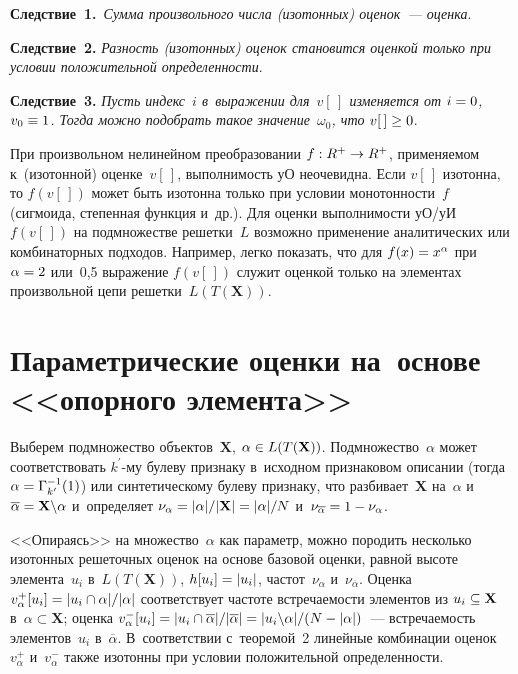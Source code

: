 \begin{multicols}{2}
     \noindent
\textbf{Следствие~1.}\ \textit{Сумма произвольного чис\-ла (изотонных) 
оценок~--- оценка}.

     \smallskip
     
     \noindent
\textbf{Следствие~2.} \textit{Раз\-ность (изотонных) оценок становится 
оцен\-кой только при условии положительной опре\-де\-лен\-ности}.

     \smallskip
     
     \noindent
\textbf{Следствие~3.} \textit{Пусть индекс~$i$ в~выражении 
для~$v[\,]$ изменяется от $i\hm=0$, $v_0\hm\equiv 1$. Тогда мож\-но 
по\-до\-брать такое значение~$\omega_0$, что} $v[\,]\hm\geq 0$. 
    
\smallskip

При произвольном нелинейном преобразовании $f: R^+\hm\to R^+$, 
при\-ме\-ня\-емом к~(изотонной) оцен\-ке~$v[\,]$, вы\-пол\-ни\-мость уО неочевидна. 
Если $v[\,]$ изотонна, то $f(v[\,])$ может быть изотонна только при условии 
мо\-но\-тон\-ности~$f$ (сигмоида, степенная функция и~др.). Для оценки 
вы\-пол\-ни\-мости уО/уИ $f(v[\,])$ на подмножестве решетки~$L$ воз\-мож\-но 
применение аналитических или комбинаторных подходов. Например, лег\-ко 
показать, что для $f(x)\hm= x^\alpha$ при $\alpha\hm=2$ или~0,5 выражение 
$f(v[\,])$ служит оцен\-кой только на элементах произвольной цепи решетки~$L(T(\mathbf{X}))$. 

\section{Параметрические оценки на~основе <<опорного 
элемента>>} 

Выберем подмножество объектов~$\mathbf{X}$, $\alpha \hm\in 
L(T(\mathbf{X}))$. Подмножество~$\alpha$ может соответствовать 
$k^\prime$-му булеву при\-зна\-ку в~исходном при\-зна\-ко\-вом описании (тогда 
$\alpha\hm= \Gamma^{-1}_{k^\prime} (1)$) или синтетическому булеву 
при\-зна\-ку, что разбивает~$\mathbf{X}$ на~$\alpha$ и~$\overline{\alpha}\hm= 
\mathbf{X}\backslash \alpha$ и~определяет $\nu_\alpha \hm= \vert \alpha \vert / 
\vert \mathbf{X}\vert \hm= \vert\alpha\vert / N$ 
и~$\nu_{\overline{\alpha}}\hm=1\hm- \nu_\alpha$. 
     
     <<Опираясь>> на множество~$\alpha$ как параметр, мож\-но породить 
несколько изотонных решеточных оценок на основе базовой оцен\-ки, рав\-ной 
высоте элемента~$u_i$ в~$L(T(\mathbf{X}))$, $h[u_i] \hm= \vert u_i\vert$, 
час\-тот~$\nu_\alpha$ и~$\nu_{\overline{\alpha}}$. Оцен\-ка $v_\alpha^+ [u_i] 
\hm= \vert u_i \cap \alpha \vert / \vert\alpha\vert$ соответствует час\-то\-те 
встре\-ча\-емости элементов из $u_i\hm\subseteq \mathbf{X}$ в~$\alpha \subset 
\mathbf{X}$; оцен\-ка $v_\alpha^-[u_i]\hm= \vert u_i \cap \overline{\alpha}\vert / 
\vert \overline{\alpha}\vert \hm= \vert u_i \backslash\alpha\vert / (N\hm- 
\vert\alpha\vert)$~--- встре\-ча\-емость элементов~$u_i$ в~$\overline{\alpha}$. 
В~соответствии с~тео\-ре\-мой~2 линейные комбинации оценок~$v_\alpha^+$ 
и~$v_\alpha^-$ так\-же изотонны при условии положительной опре\-де\-лен\-ности. 
     

\end{multicols}
